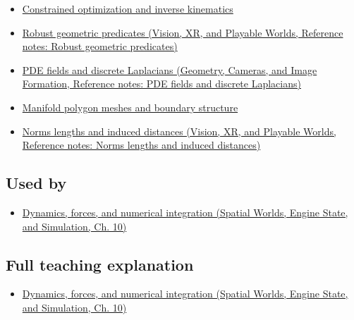 \begin{itemize}
\tightlist
\item
  \hyperref[appendix-29f4bea4c2bb]{Constrained optimization and inverse kinematics}
\item
  \href{../07-Vision-XR-and-Playable-Worlds/main.pdf\#nameddest=appendix-341296fb3f64}{Robust geometric predicates (Vision, XR, and Playable Worlds, Reference notes: Robust geometric predicates)}
\item
  \href{../03-Geometry-Cameras-and-Image-Formation/main.pdf\#nameddest=appendix-1988d465c119}{PDE fields and discrete Laplacians (Geometry, Cameras, and Image Formation, Reference notes: PDE fields and discrete Laplacians)}
\item
  \hyperref[appendix-fab348609369]{Manifold polygon meshes and boundary structure}
\item
  \href{../07-Vision-XR-and-Playable-Worlds/main.pdf\#nameddest=appendix-49933872bb51}{Norms lengths and induced distances (Vision, XR, and Playable Worlds, Reference notes: Norms lengths and induced distances)}
\end{itemize}

\subsection{Used by}\label{appendix-a9ba01fa72a6-used-by}

\begin{itemize}
\tightlist
\item
  \href{../05-Spatial-Worlds-Engine-State-and-Simulation/main.pdf\#nameddest=04-visual-computing-ii-ch029-dynamics-forces-and-numerical-integration}{Dynamics, forces, and numerical integration (Spatial Worlds, Engine State, and Simulation, Ch. 10)}
\end{itemize}

\subsection{Full teaching explanation}\label{appendix-a9ba01fa72a6-full-teaching-explanation}

\begin{itemize}
\tightlist
\item
  \href{../05-Spatial-Worlds-Engine-State-and-Simulation/main.pdf\#nameddest=04-visual-computing-ii-ch029-dynamics-forces-and-numerical-integration}{Dynamics, forces, and numerical integration (Spatial Worlds, Engine State, and Simulation, Ch. 10)}
\end{itemize}

